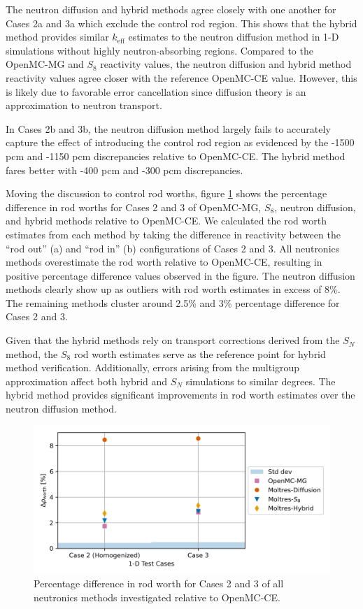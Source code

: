 \documentclass[letterpaper]{mc2025}
\begin{document}
The neutron diffusion and hybrid methods agree closely with one another for Cases 2a and 3a which
exclude the control rod region. This shows that the hybrid method provides similar $k_\text{eff}$
estimates to the neutron diffusion method in 1-D simulations without highly neutron-absorbing
regions. Compared to the OpenMC-MG and $S_8$ reactivity values, the neutron diffusion and hybrid
method reactivity values agree closer with the reference OpenMC-CE value. However, this is likely
due to favorable error cancellation since diffusion theory is an approximation to neutron
transport.

In Cases 2b and 3b, the neutron diffusion method largely fails to accurately capture the
effect of introducing the control rod region as evidenced by the -1500 pcm and -1150 pcm
discrepancies relative to OpenMC-CE. The hybrid method fares better with -400 pcm and -300 pcm
discrepancies.

Moving the discussion to control rod worths, figure \ref{fig:1d-worth} shows the percentage
difference in rod worths for Cases 2 and 3 of OpenMC-MG, $S_8$, neutron diffusion, and hybrid
methods relative to OpenMC-CE. We calculated the rod worth estimates from each method by taking the
difference in reactivity between the ``rod out'' (a) and ``rod in'' (b) configurations of Cases 2
and 3. All neutronics methods overestimate the rod worth relative to OpenMC-CE, resulting in
positive percentage difference values observed in the figure.
The neutron diffusion methods clearly show up as outliers with rod worth estimates in excess
of 8\%. The remaining methods cluster around 2.5\% and 3\% percentage difference for Cases
2 and 3.

Given that the hybrid methods rely on transport corrections derived from the $S_N$ method, the
$S_8$ rod worth estimates serve as the
reference point for hybrid method verification. Additionally, errors arising from the multigroup
approximation affect both hybrid and $S_N$ simulations to similar degrees. The hybrid method
provides significant improvements in rod worth estimates over the neutron diffusion method.
%
\begin{figure}[htb!]
  \centering
  \includegraphics[width=0.75\columnwidth]{worth}
  \caption{Percentage difference in rod worth for Cases 2 and 3 of all neutronics methods
  investigated relative to OpenMC-CE.}
  \label{fig:1d-worth}
\end{figure}
\end{document}
